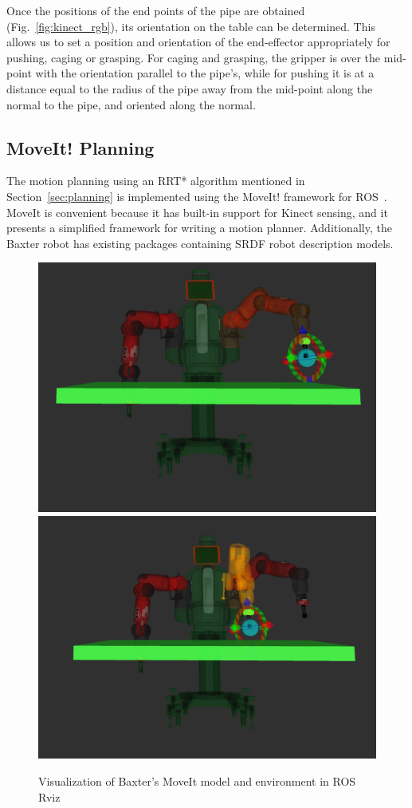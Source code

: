 \documentclass[runningheads,letterpaper]{llncs}
\begin{document}
Once the positions of the end points of the pipe are obtained (Fig.~\ref{fig:kinect_rgb}), its orientation on the table can be determined. This allows us to set a position and orientation of the end-effector appropriately for pushing, caging or grasping. For caging and grasping, the gripper is over the mid-point with the orientation parallel to the pipe's, while for pushing it is at a distance equal to the radius of the pipe away from the mid-point along the normal to the pipe, and oriented along the normal.


\subsection{MoveIt! Planning}
The motion planning using an RRT* algorithm mentioned in Section~\ref{sec:planning} is implemented using the MoveIt! framework for ROS~\cite{sucan2013moveit}. MoveIt is convenient because it has built-in support for Kinect sensing, and it presents a simplified framework for writing a motion planner. Additionally, the Baxter robot has existing packages containing SRDF robot description models.

\begin{figure}[ht]
\centering
	\includegraphics[height=0.3\columnwidth]{images/baxter_mv3.png}
	\includegraphics[height=0.3\columnwidth]{images/baxter_mv4.png}	
\caption{Visualization of Baxter's MoveIt model and environment in ROS Rviz}
\label{fig:moveit}
\end{figure}
\end{document}
